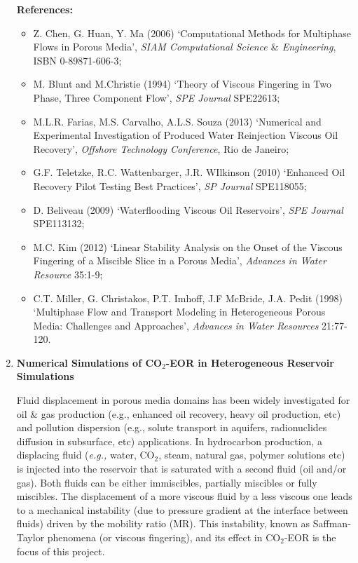 \documentclass[12pts,a4paper,amsmath,amssymb,floatfix]{article}%
\newcommand{\eg}{{\it e.g., }}
\begin{document}
\begin{enumerate}[label=\bfseries Project: \arabic*:]
\noindent
{\bf References:}
\begin{itemize}
\item Z. Chen, G. Huan, Y. Ma (2006) `Computational Methods for Multiphase Flows in Porous Media', {\it SIAM Computational Science $\&$ Engineering}, ISBN 0-89871-606-3;
\item M. Blunt and M.Christie (1994) `Theory of Viscous Fingering in Two Phase, Three Component Flow', {\it SPE Journal} SPE22613;
\item M.L.R. Farias, M.S. Carvalho, A.L.S. Souza (2013) `Numerical and Experimental Investigation of Produced Water Reinjection Viscous Oil Recovery', {\it Offshore Technology Conference}, Rio de Janeiro;
\item G.F. Teletzke, R.C. Wattenbarger, J.R. WIlkinson (2010) `Enhanced Oil Recovery Pilot Testing Best Practices', {\it SP Journal} SPE118055;
\item D. Beliveau (2009) `Waterflooding Viscous Oil Reservoirs', {\it SPE Journal} SPE113132;
\item M.C. Kim (2012) `Linear Stability Analysis on the Onset of the Viscous Fingering of a Miscible Slice in a Porous Media', {\it Advances in Water Resource} 35:1-9;%
\item C.T. Miller, G. Christakos, P.T. Imhoff, J.F McBride, J.A. Pedit (1998) `Multiphase Flow and Transport Modeling in Heterogeneous Porous Media: Challenges and Approaches', {\it Advances in Water Resources} 21:77-120.
\end{itemize}


\clearpage

\item {\bf Numerical Simulations of CO$_{2}$-EOR in Heterogeneous Reservoir Simulations}

  Fluid displacement in porous media domains has been widely investigated for oil $\&$ gas production (e.g., enhanced oil recovery, heavy oil production, etc) and pollution dispersion (e.g., solute transport in aquifers, radionuclides diffusion in subsurface, etc) applications. In hydrocarbon production, a displacing fluid (\eg water, CO$_{2}$, steam, natural gas, polymer solutions etc) is injected into the reservoir that is saturated with a second fluid (oil and/or gas). Both fluids can be either immiscibles, partially miscibles or fully miscibles. The displacement of a more viscous fluid by a less viscous one leads to a mechanical instability (due to pressure gradient at the interface between fluids) driven by the mobility ratio (MR). This instability, known as Saffman-Taylor phenomena (or viscous fingering), and its effect in CO$_{2}$-EOR is the focus of this project.


\end{enumerate}
\end{document}
